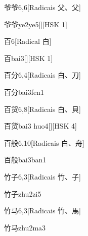 \begin{entry}{爷爷}{6,6}[Radicais ⽗、⽗]
  \begin{phonetics}{爷爷}{ye2ye5}[][HSK 1]
  \end{phonetics}
\end{entry}

\begin{entry}{百}{6}[Radical ⽩]
  \begin{phonetics}{百}{bai3}[][HSK 1]
  \end{phonetics}
\end{entry}

\begin{entry}{百分}{6,4}[Radicais ⽩、⼑]
  \begin{phonetics}{百分}{bai3fen1}
  \end{phonetics}
\end{entry}

\begin{entry}{百货}{6,8}[Radicais ⽩、⾙]
  \begin{phonetics}{百货}{bai3 huo4}[][HSK 4]
  \end{phonetics}
\end{entry}

\begin{entry}{百般}{6,10}[Radicais ⽩、⾈]
  \begin{phonetics}{百般}{bai3ban1}
  \end{phonetics}
\end{entry}

\begin{entry}{竹子}{6,3}[Radicais ⽵、⼦]
  \begin{phonetics}{竹子}{zhu2zi5}
  \end{phonetics}
\end{entry}

\begin{entry}{竹马}{6,3}[Radicais ⽵、⾺]
  \begin{phonetics}{竹马}{zhu2ma3}
  \end{phonetics}
\end{entry}


